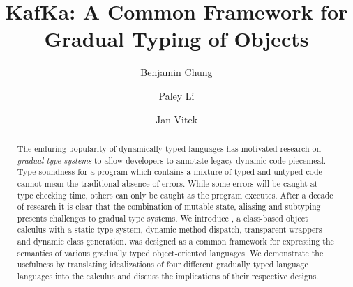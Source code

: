\documentclass[a4paper,USenglish]{tex/lipics-v2016}
\begin{document}
\title{KafKa: A Common Framework for Gradual Typing of Objects}

\author[1]{Benjamin Chung}
\author[2]{Paley Li}
\author[3]{Jan Vitek}




\EventLogo{}


\maketitle

\begin{abstract}
The enduring popularity of dynamically typed languages has motivated
research on \emph{gradual type systems} to allow developers to annotate
legacy dynamic code piecemeal. Type soundness for a program which contains a
mixture of typed and untyped code cannot mean the traditional absence of
errors. While some errors will be caught at type checking time, others can only
be caught as the program executes. After a decade of research it is clear
that the combination of mutable state, aliasing and subtyping presents
challenges to gradual type systems.  We introduce \kafka, a class-based
object calculus with a static type system, dynamic method dispatch,
transparent wrappers and dynamic class generation. \kafka was designed as a
common framework for expressing the semantics of various gradually typed
object-oriented languages. We demonstrate the usefulness by translating
idealizations of four different gradually typed language languages into the
calculus and discuss the implications of their respective designs.
\end{abstract}
\end{document}
